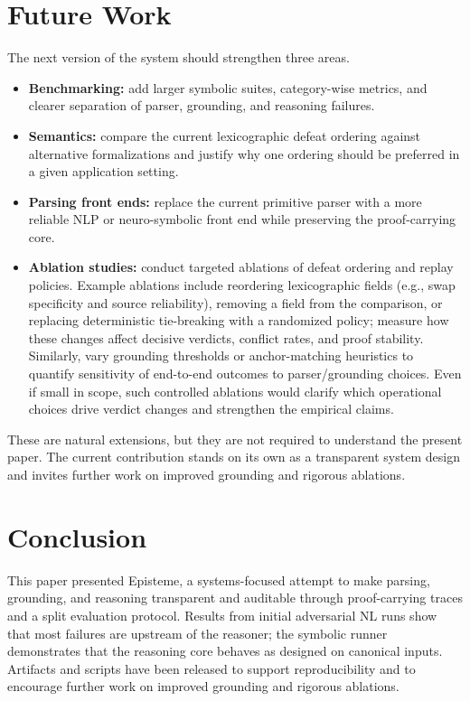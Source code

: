\documentclass[11pt]{article}
\begin{document}
\section{Future Work}
\label{sec:future}
The next version of the system should strengthen three areas.
\begin{itemize}
  \item \textbf{Benchmarking:} add larger symbolic suites, category-wise metrics, and
    clearer separation of parser, grounding, and reasoning failures.
  \item \textbf{Semantics:} compare the current lexicographic defeat ordering against
    alternative formalizations and justify why one ordering should be preferred in a
    given application setting.
  \item \textbf{Parsing front ends:} replace the current primitive parser with a more
    reliable NLP or neuro-symbolic front end while preserving the proof-carrying core.
  \item \textbf{Ablation studies:} conduct targeted ablations of defeat ordering and
    replay policies. Example ablations include reordering lexicographic fields
    (e.g., swap specificity and source reliability), removing a field from the
    comparison, or replacing deterministic tie-breaking with a randomized policy;
    measure how these changes affect decisive verdicts, conflict rates, and proof
    stability. Similarly, vary grounding thresholds or anchor-matching heuristics to
    quantify sensitivity of end-to-end outcomes to parser/grounding choices. Even if
    small in scope, such controlled ablations would clarify which operational choices
    drive verdict changes and strengthen the empirical claims.
\end{itemize}

These are natural extensions, but they are not required to understand the present paper.
The current contribution stands on its own as a transparent system design and invites
further work on improved grounding and rigorous ablations.

\section{Conclusion}
This paper presented Episteme, a systems-focused attempt to make parsing, grounding, and reasoning
transparent and auditable through proof-carrying traces and a split evaluation protocol.
Results from initial adversarial NL runs show that most failures are upstream of the
reasoner; the symbolic runner demonstrates that the reasoning core behaves as designed
on canonical inputs. Artifacts and scripts have been released to support reproducibility and
to encourage further work on improved grounding and rigorous ablations.



\end{document}
